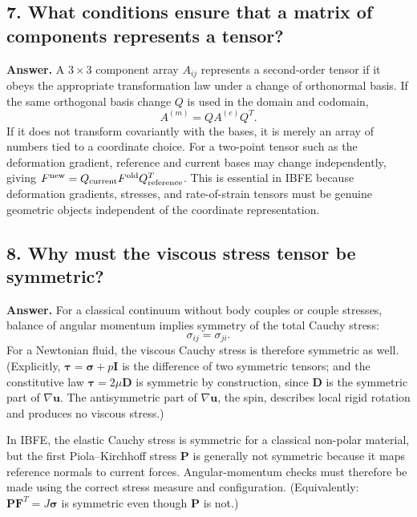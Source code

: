\documentclass[12pt]{article}
\begin{document}
\subsection*{7. What conditions ensure that a matrix of components represents a tensor?}

\textbf{Answer.}
A $3\times 3$ component array $A_{ij}$ represents a second-order tensor if it obeys the appropriate transformation law under a change of orthonormal basis. If the same orthogonal basis change $Q$ is used in the domain and codomain,
\[
A^{(m)} = Q A^{(e)} Q^T.
\]
If it does not transform covariantly with the bases, it is merely an array of numbers tied to a coordinate choice. For a two-point tensor such as the deformation gradient, reference and current bases may change independently, giving $F^{\rm new}=Q_{\rm current}F^{\rm old}Q_{\rm reference}^{T}$.
This is essential in IBFE because deformation gradients, stresses, and rate-of-strain
tensors must be genuine geometric objects independent of the coordinate
representation.

\subsection*{8. Why must the viscous stress tensor be symmetric?}

\textbf{Answer.}
For a classical continuum without body couples or couple stresses, balance of angular momentum implies symmetry of the total Cauchy stress:
\[
\sigma_{ij} = \sigma_{ji}.
\]
For a Newtonian fluid, the viscous Cauchy stress is therefore symmetric as well. (Explicitly, $\boldsymbol\tau=\boldsymbol\sigma+p\mathbf I$ is the difference of two symmetric tensors; and the constitutive law $\boldsymbol\tau=2\mu\mathbf D$ is symmetric by construction, since $\mathbf D$ is the symmetric part of $\nabla\mathbf u$. The antisymmetric part of $\nabla\mathbf u$, the spin, describes local rigid rotation and produces no viscous stress.)

In IBFE, the elastic Cauchy stress is symmetric for a classical non-polar material, but the first Piola--Kirchhoff stress $\mathbf P$ is generally not symmetric because it maps reference normals to current forces. Angular-momentum checks must therefore be made using the correct stress measure and configuration. (Equivalently: $\mathbf P\mathbf F^T = J\boldsymbol\sigma$ is symmetric even though $\mathbf P$ is not.)
\end{document}
